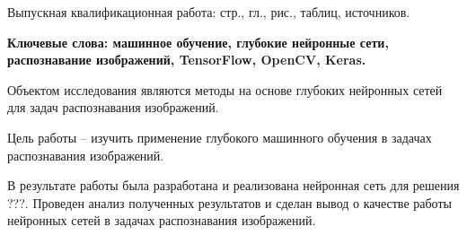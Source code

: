 
Выпускная квалификационная работа: \pageref{LastPage} стр., 
 гл., 
\totalfigures{} рис.,
\totaltables{} таблиц,
 источников.

\textbf{Ключевые слова: машинное обучение, глубокие нейронные сети, распознавание изображений, TensorFlow, OpenCV, Keras.}

Объектом исследования являются методы на основе глубоких нейронных сетей для задач распознавания изображений. 

Цель работы – изучить применение глубокого машинного обучения в задачах распознавания изображений.

В результате работы была разработана и реализована нейронная сеть для решения ???. Проведен анализ полученных результатов и сделан вывод о качестве работы нейронных сетей в задачах распознавания изображений.

\clearpage